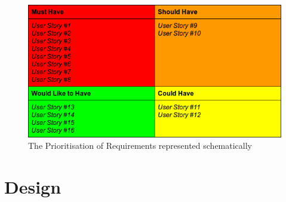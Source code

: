 \documentclass{l3proj}
\begin{document}
{
\begin{figure}[h]
\caption{The Prioritisation of Requirements represented schematically}
\centering
\includegraphics[scale=1]{Prioritisation.png}
\end{figure}
}

\chapter{Design}
\label{design}

\end{document}
